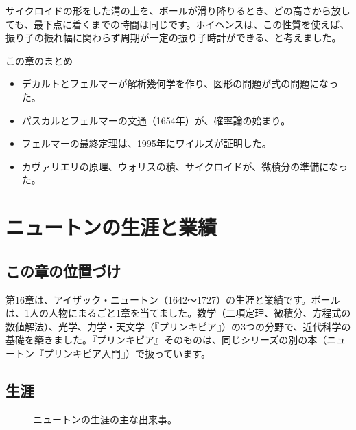 \documentclass[a4paper,11pt,openany]{ltjsbook}
\begin{document}
サイクロイドの形をした溝の上を、ボールが滑り降りるとき、どの高さから放しても、最下点に着くまでの時間は同じです。ホイヘンスは、この性質を使えば、振り子の振れ幅に関わらず周期が一定の振り子時計ができる、と考えました。

\begin{pointbox}{この章のまとめ}
\begin{itemize}[leftmargin=*]
\item デカルトとフェルマーが解析幾何学を作り、図形の問題が式の問題になった。
\item パスカルとフェルマーの文通（1654年）が、確率論の始まり。
\item フェルマーの最終定理は、1995年にワイルズが証明した。
\item カヴァリエリの原理、ウォリスの積、サイクロイドが、微積分の準備になった。
\end{itemize}
\end{pointbox}

\chapter{ニュートンの生涯と業績}

\section{この章の位置づけ}

第16章は、アイザック・ニュートン（1642〜1727）の生涯と業績です。ボールは、1人の人物にまるごと1章を当てました。数学（二項定理、微積分、方程式の数値解法）、光学、力学・天文学（『プリンキピア』）の3つの分野で、近代科学の基礎を築きました。『プリンキピア』そのものは、同じシリーズの別の本（ニュートン『プリンキピア入門』）で扱っています。

\section{生涯}

\begin{figure}[htbp]
\centering
{}
\caption{ニュートンの生涯の主な出来事。}
\end{figure}
\end{document}
